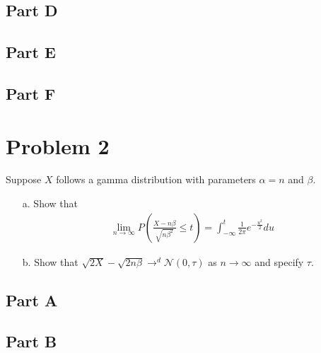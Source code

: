 \documentclass{article}
\begin{document}
\subsection*{Part D}
\subsection*{Part E}
%
\subsection*{Part F}
%
\clearpage

\section*{Problem 2}
Suppose $X$ follows a gamma distribution with parameters $\alpha = n$ and $\beta$.
\begin{enumerate}
\item[a.] Show that
\begin{align*}
\lim_{n\rightarrow \infty} P(\frac{X-n\beta}{\sqrt{n\beta^2}} \leq t) = \int_{-\infty}^{t} \frac{1}{2\pi} e^{-\frac{u^2}{2}} du
\end{align*}
\item[b.] Show that $\sqrt{2X} - \sqrt{2n\beta} \rightarrow^d \mathcal{N}(0,\tau)$ as $n\rightarrow \infty$ and specify $\tau$.
\end{enumerate}
\subsection*{Part A}
\subsection*{Part B}


\clearpage
\end{document}
